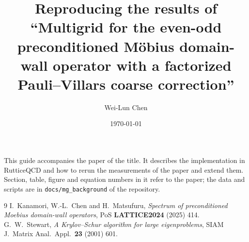 \documentclass[11pt,a4paper]{article}
\title{Reproducing the results of ``Multigrid for the even-odd preconditioned M\"obius
domain-wall operator with a factorized Pauli--Villars coarse correction''}
\author{Wei-Lun Chen}
\date{\today}
\makeatletter
\newcounter{alg}
\renewcommand\maketitle{\begin{center}%
  {\large\bfseries\@title\par}\vspace{1.4ex}%
  {\normalsize\@author\par}\vspace{0.4ex}%
  {\small\itshape\@date\par}\end{center}\vspace{0.6ex}}
\numberwithin{equation}{section}
\theoremstyle{plain}
\theoremstyle{remark}
\makeatother
\begin{document}
\maketitle

\noindent This guide accompanies the paper of the title. It describes the implementation in
RutticeQCD and how to rerun the measurements of the paper and extend them. Section, table,
figure and equation numbers in it refer to the paper; the data and scripts are in
\texttt{docs/mg\_background} of the repository.



\begin{thebibliography}{9}
 I.~Kanamori, W.-L.~Chen and H.~Matsufuru, \emph{Spectrum of preconditioned Moebius domain-wall operators}, PoS \textbf{LATTICE2024} (2025) 414.
 G.~W.~Stewart, \emph{A Krylov--Schur algorithm for large eigenproblems},
SIAM J.\ Matrix Anal.\ Appl.\ \textbf{23} (2001) 601.
\end{thebibliography}
\end{document}
